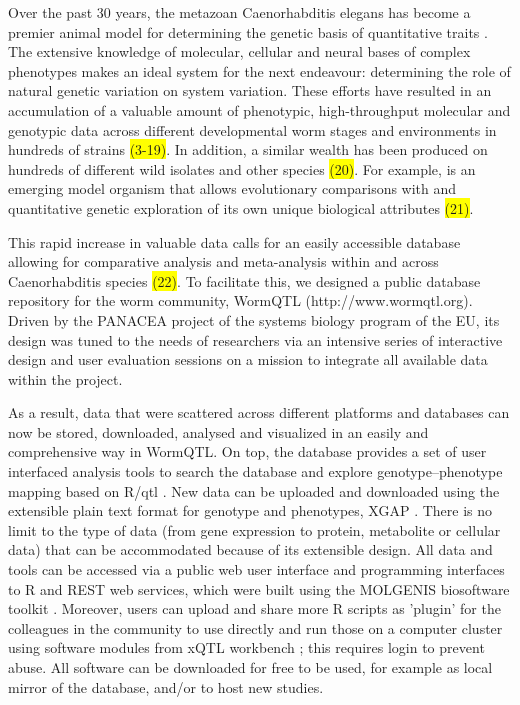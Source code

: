Over the past 30 years, the metazoan Caenorhabditis elegans has become a premier animal model for 
determining the genetic basis of quantitative traits \cite{Gaertner:2010, Kammenga:2008}. The 
extensive knowledge of molecular, cellular and neural bases of complex phenotypes makes 
 an ideal system for the next endeavour: determining the role of natural genetic 
variation on system variation. These efforts have resulted in an accumulation of a valuable amount 
of phenotypic, high-throughput molecular and genotypic data across different developmental worm 
stages and environments in hundreds of strains \colorbox{yellow}{(3-19)}. In addition, a similar wealth has been 
produced on hundreds of different  wild isolates and other species \colorbox{yellow}{(20)}. 
For example,  is an emerging model organism that allows evolutionary comparisons 
with  and quantitative genetic exploration of its own unique biological 
attributes \colorbox{yellow}{(21)}.

This rapid increase in valuable data calls for an easily accessible database allowing for 
comparative analysis and meta-analysis within and across Caenorhabditis species \colorbox{yellow}{(22)}. To 
facilitate this, we designed a public database repository for the worm community, WormQTL 
(http://www.wormqtl.org). Driven by the PANACEA project of the systems biology program of 
the EU, its design was tuned to the needs of  researchers via an intensive 
series of interactive design and user evaluation sessions on a mission to integrate all 
available data within the project.

As a result, data that were scattered across different platforms and databases can now be 
stored, downloaded, analysed and visualized in an easily and comprehensive way in WormQTL. 
On top, the database provides a set of user interfaced analysis tools to search the database 
and explore genotype–phenotype mapping based on R/qtl \cite{Broman:2003, Arends:2010}. New 
data can be uploaded and downloaded using the extensible plain text format for genotype and 
phenotypes, XGAP \cite{Swertz:2010a}. There is no limit to the type of data (from gene 
expression to protein, metabolite or cellular data) that can be accommodated because of its 
extensible design. All data and tools can be accessed via a public web user interface and 
programming interfaces to R and REST web services, which were built using the MOLGENIS 
biosoftware toolkit \cite{Swertz:2010b}. Moreover, users can upload and share more R 
scripts as 'plugin' for the colleagues in the community to use directly and run those on a 
computer cluster using software modules from xQTL workbench \cite{Arends:2012a, Snoek:2012}; this requires 
login to prevent abuse. All software can be downloaded for free to be used, for example as 
local mirror of the database, and/or to host new studies.

